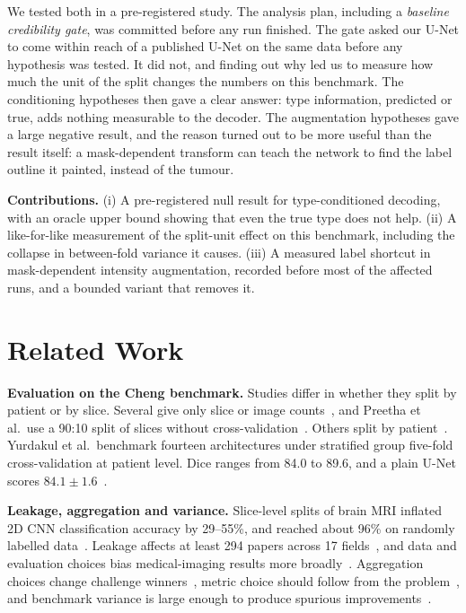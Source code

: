 \documentclass[runningheads]{llncs}
\begin{document}
We tested both in a pre-registered study. The analysis plan, including a
\emph{baseline credibility gate}, was committed before any run finished. The
gate asked our U-Net to come within reach of a published U-Net on the same data
before any hypothesis was tested. It did not, and finding out why led us to
measure how much the unit of the split changes the numbers on this benchmark.
The conditioning hypotheses then gave a clear answer: type information, predicted
or true, adds nothing measurable to the decoder. The augmentation hypotheses
gave a large negative result, and the reason turned out to be more useful than
the result itself: a mask-dependent transform can teach the network to find the
label outline it painted, instead of the tumour.

\noindent\textbf{Contributions.} (i) A pre-registered null result for
type-conditioned decoding, with an oracle upper bound showing that even the true
type does not help. (ii) A like-for-like measurement of the split-unit effect on
this benchmark, including the collapse in between-fold variance it causes.
(iii) A measured label shortcut in mask-dependent intensity augmentation, recorded
before most of the affected runs, and a bounded variant that removes it.

\section{Related Work}
\label{sec:related}

\noindent\textbf{Evaluation on the Cheng benchmark.}
Studies differ in whether they split by patient or by slice. Several give only
slice or image counts~\cite{gupta2023,rai2024,preetha2025}, and Preetha et al.\
use a 90:10 split of slices without cross-validation~\cite{preetha2025}. Others
split by patient~\cite{avazov2024,yurdakul2026}. Yurdakul et al.\ benchmark
fourteen architectures under stratified group five-fold cross-validation at
patient level. Dice ranges from 84.0 to 89.6, and a plain U-Net scores
$84.1\pm1.6$~\cite[Table~2]{yurdakul2026}.

\noindent\textbf{Leakage, aggregation and variance.}
Slice-level splits of brain MRI inflated 2D CNN classification accuracy by
29--55\%, and reached about 96\% on randomly labelled data~\cite{yagis2021}.
Leakage affects at least 294 papers across 17 fields~\cite{kapoor2023}, and data
and evaluation choices bias medical-imaging results more broadly~\cite{varoquaux2022}.
Aggregation choices change challenge winners~\cite{maierhein2018}, metric choice
should follow from the problem~\cite{maierhein2024}, and benchmark variance is
large enough to produce spurious improvements~\cite{bouthillier2021}.
\end{document}
